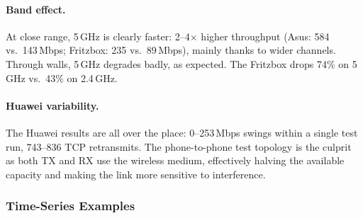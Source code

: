\paragraph{Band effect.}
At close range, 5\,GHz is clearly faster: 2--4$\times$ higher throughput (Asus: 584 vs.\ 143\,Mbps; Fritzbox: 235 vs.\ 89\,Mbps), mainly thanks to wider channels.
Through walls, 5\,GHz degrades badly, as expected. The Fritzbox drops 74\% on 5\,GHz vs.\ 43\% on 2.4\,GHz.

\paragraph{Huawei variability.}
The Huawei results are all over the place: 0--253\,Mbps swings within a single test run, 743--836 \ac{TCP} retransmits. The phone-to-phone test topology is the culprit as both TX and RX use the wireless medium, effectively halving the available capacity and making the link more sensitive to interference.

\subsubsection*{Time-Series Examples}
\label{sec:results-wifi-timeseries}


